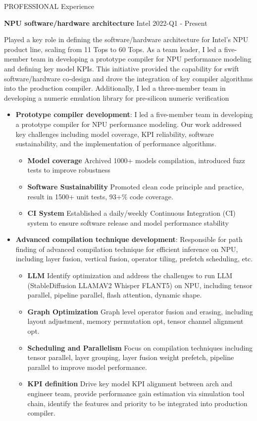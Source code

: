 \documentclass{resume} %
\begin{document}
\begin{rSection}{PROFESSIONAL Experience}

\noindent
\textbf{NPU software/hardware architecture} \hfill Intel 2022-Q1 - Present 

Played a key role in defining the software/hardware architecture for Intel's NPU product line, scaling from 11 Tops to 60 Tops. As a team leader, I led a five-member team in developing a prototype compiler for NPU performance modeling and defining key model KPIs. This initiative provided the capability for swift software/hardware co-design and drove the integration of key compiler algorithms into the production compiler. Additionally, I led a three-member team in developing a numeric emulation library for pre-silicon numeric verification

\begin{itemize}
\item \textbf{Prototype compiler development}: 
I led a five-member team in developing a prototype compiler for NPU performance modeling. Our work addressed key challenges including model coverage, KPI reliability, software sustainability, and the implementation of performance algorithms.
\begin{itemize}
    \item \textbf{Model coverage} Archived 1000+ models compilation, introduced fuzz tests to improve robustness 
    \item \textbf{Software Sustainability} Promoted clean code principle and practice, result in 1500+ unit tests, 93+\% code coverage.
    \item \textbf{CI System} Established a daily/weekly Continuous Integration (CI) system to ensure software release and model performance stability
\end{itemize}

\item \textbf{Advanced compilation technique development}: 
Responsible for path finding of advanced compilation technique for efficient inference on NPU, including layer fusion, vertical fusion, operator tiling, prefetch scheduling, etc. 
\begin{itemize}
    \item \textbf{LLM} Identify optimization and address the challenges to run LLM (StableDiffusion LLAMAV2 Whisper FLANT5) on NPU, including tensor parallel, pipeline parallel, flash attention, dynamic shape.
    \item \textbf{Graph Optimization} Graph level operator fusion and erasing, including layout adjustment, memory permutation opt, tensor channel alignment opt. 
    \item \textbf{Scheduling and Parallelism} Focus on compilation techniques including tensor parallel, layer grouping, layer fusion weight prefetch, pipeline parallel to improve model performance.
    \item \textbf{KPI definition} Drive key model KPI alignment between arch and engineer team, provide performance gain estimation via simulation tool chain, identify the features and priority to be integrated into production compiler.
\end{itemize}


\end{itemize}
\end{rSection}
\end{document}
